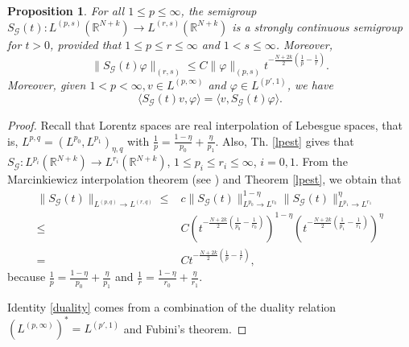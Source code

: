 \documentclass[12pt]{amsart}
\newtheorem{proposition}[theorem]{Proposition}
\newcommand{\R}{\mathbb{R}}
\begin{document}
\begin{proposition}\label{lpwest}
	For all $1\leq p \leq \infty$, the semigroup $S_\mathcal{G}(t):L^{(p,s)}(\R^{N+k}) \to L^{(r,s)}(\R^{N+k})$ is a strongly continuous semigroup for $t>0$, provided that $1\leq p \leq r\leq\infty$ and $1<s\leq \infty$. Moreover,
	\begin{equation}\label{semigroupw}
		\|S_\mathcal{G}(t)\varphi\|_{(r,s)}\leq C\|\varphi\|_{(p,s)}t^{-\frac{N+2k}{2}\left(\frac{1}{p}-\frac{1}{r}\right)} .
	\end{equation}
	Moreover, given $1<p<\infty, v \in L^{(p, \infty)}$ and $\varphi \in L^{(p', 1)}$, we have
	\begin{equation}\label{duality}
		\langle S_\mathcal{G}(t) v, \varphi\rangle = \langle v,  S_\mathcal{G}(t) \varphi\rangle .
	\end{equation}
\end{proposition}
\begin{proof}
	Recall that Lorentz spaces are real interpolation of Lebesgue spaces, that is, $L^{p,q} = (L^{p_0}, L^{p_1})_{\eta,q}$ with $\frac{1}{p} = \frac{1-\eta}{p_0} + \frac{\eta}{p_1}$. Also, Th. \ref{lpest} gives that $S_\mathcal{G}: L^{p_i}(\R^{N+k}) \to L^{r_i}(\R^{N+k})$, $1\leq p_i\leq r_i\leq \infty$, $i=0,1$. From the Marcinkiewicz interpolation theorem (see \cite{bergh}) and Theorem \ref{lpest}, we obtain that 
	\begin{align*}
		\|S_\mathcal{G}(t)\|_{L^{(p,q)}\to L^{(r,q)}} \leq & c \|S_\mathcal{G}(t)\|_{L^{p_0}\to L^{r_0}}^{1-\eta} \|S_\mathcal{G}(t)\|_{L^{p_1}\to L^{r_1}}^\eta  \\ 
		\leq & C \left(t^{-\frac{N+2k}{2}\left(\frac{1}{p_0}-\frac{1}{r_0}\right)}\right)^{1-\eta} 
		\left(t^{-\frac{N+2k}{2}\left(\frac{1}{p_1}-\frac{1}{r_1}\right)}\right)^{\eta} \\
		= & C t^{-\frac{N+2k}{2}\left(\frac{1}{p}-\frac{1}{r}\right)} ,
	\end{align*}
	because $\frac{1}{p} = \frac{1-\eta}{p_0} + \frac{\eta}{p_1}$ and $\frac{1}{r} = \frac{1-\eta}{r_0} + \frac{\eta}{r_1}$.
	
	Identity \eqref{duality} comes from a combination of the duality relation $(L^{(p, \infty)})^* = L^{(p', 1)}$ and Fubini's theorem.
\end{proof}
\end{document}
